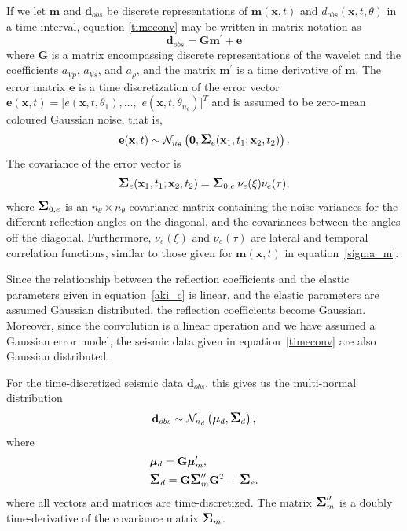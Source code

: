 \documentclass[screen,citenumeric,long,10pt]{nrdoc_060418}
\newcommand{\vect}[1]{\ensuremath{\mathbf{#1}}}
\newcommand{\bmu}{\bm\mu}
\newcommand{\bSigma}{\mbox{\large\ensuremath{\boldsymbol{\Sigma}}}}
\newcommand{\cel}{\nu_e}
\newcommand{\cet}{\nu_e}
\begin{document}
\begin{multicols}{2}
If we let $\vect{m}$ and $\vect{d}_{obs}$ be discrete representations
of $\vect{m}(\vect{x},t)$ and $d_{obs}(\vect{x},t,\theta)$ in a time
interval, equation \eqref{timeconv} may be written in matrix
notation as 
%
\begin{equation}
  \vect{d}_{obs} = \vect{G}\vect{m}^{\prime} + \vect{e}    
\end{equation}
%
\noindent
where $\vect{G}$ is a matrix encompassing discrete representations of
the wavelet and the coefficients $a_{Vp}$, $a_{V\!s}$, and $a_\rho$, and
the matrix $\vect{m}^{\prime}$ is a time derivative of $\vect{m}$. The
error matrix $\vect{e}$ is a time discretization of the error vector
$\vect{e}(\vect{x},t) = [e(\vect{x},t,\theta_1),\ldots,$
$e(\vect{x},t,\theta_{n_{\theta}})]^T$ and is assumed to be zero-mean
coloured Gaussian noise, that is, 
%
\begin{equation}  
  \vect{e}(\vect{x},t) 
    \sim \mathcal{N}_{n_\theta}\left(\vect{0},
               \bSigma_e(\vect{x}_1,t_1;\vect{x}_2,t_2)\right).
\label{edist}
\end{equation}
%
The covariance of the error vector is
%
\begin{equation}
  \bSigma_e(\vect{x}_1,t_1;\vect{x}_2,t_2)
    = \bSigma_{0,e} \: \cel(\xi) \cet(\tau), \label{sigma_e}
\end{equation}
%
where $\bSigma_{0,e}$ is an $n_{\theta}\times n_{\theta}$
covariance matrix containing the noise variances for the different
reflection angles on the diagonal, and the covariances between the
angles off the diagonal. Furthermore, $\cel(\xi)$ and $\cet(\tau)$
are lateral and temporal correlation functions, similar to those
given for $\vect{m}(\vect{x},t)$ in equation~\eqref{sigma_m}.

Since the relationship between the reflection coefficients and the
elastic parameters given in equation~\eqref{aki_c} is linear, and
the elastic parameters are assumed Gaussian distributed, the
reflection coefficients become Gaussian. Moreover, since the
convolution is a linear operation and we have assumed a Gaussian error
model, the seismic data given in equation~\eqref{timeconv} are also 
Gaussian distributed.

For the time-discretized seismic data $\vect{d}_{obs}$, this gives us
the multi-normal distribution
%
\begin{equation}  
  \vect{d}_{obs} \sim 
    \mathcal{N}_{n_d}\left(\bmu_d,\bSigma_d\right),
\label{ddist}
\end{equation}
%
where
%
\begin{align}
  &\bmu_d = \vect{G}\bmu^{\prime}_{m},\\
  &\bSigma_d = \vect{G}\bSigma^{\prime\prime}_{m}\vect{G}^T + \bSigma_e.
\end{align}
%
where all vectors and matrices are time-discretized. The matrix
$\bSigma^{\prime\prime}_{m}$ is a doubly time-derivative of the
covariance matrix $\bSigma_m$.


\end{multicols}
\end{document}
